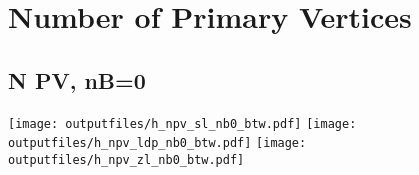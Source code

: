 \documentclass[11pt]{article}
\begin{document}













    \section{Number of Primary Vertices }

    \subsection{ N PV, nB=0 }

    \noindent
     \texttt{[image: outputfiles/h\_npv\_sl\_nb0\_btw.pdf]}
     \texttt{[image: outputfiles/h\_npv\_ldp\_nb0\_btw.pdf]}
     \texttt{[image: outputfiles/h\_npv\_zl\_nb0\_btw.pdf]}
\end{document}
